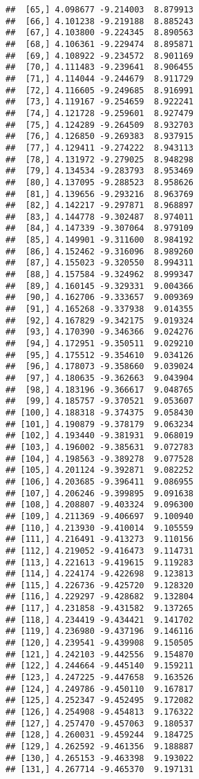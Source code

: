 \documentclass[]{book}
\theoremstyle{definition}
\theoremstyle{definition}
\theoremstyle{definition}
\theoremstyle{remark}
\begin{document}
\begin{verbatim}
##  [65,] 4.098677 -9.214003  8.879913
##  [66,] 4.101238 -9.219188  8.885243
##  [67,] 4.103800 -9.224345  8.890563
##  [68,] 4.106361 -9.229474  8.895871
##  [69,] 4.108922 -9.234572  8.901169
##  [70,] 4.111483 -9.239641  8.906455
##  [71,] 4.114044 -9.244679  8.911729
##  [72,] 4.116605 -9.249685  8.916991
##  [73,] 4.119167 -9.254659  8.922241
##  [74,] 4.121728 -9.259601  8.927479
##  [75,] 4.124289 -9.264509  8.932703
##  [76,] 4.126850 -9.269383  8.937915
##  [77,] 4.129411 -9.274222  8.943113
##  [78,] 4.131972 -9.279025  8.948298
##  [79,] 4.134534 -9.283793  8.953469
##  [80,] 4.137095 -9.288523  8.958626
##  [81,] 4.139656 -9.293216  8.963769
##  [82,] 4.142217 -9.297871  8.968897
##  [83,] 4.144778 -9.302487  8.974011
##  [84,] 4.147339 -9.307064  8.979109
##  [85,] 4.149901 -9.311600  8.984192
##  [86,] 4.152462 -9.316096  8.989260
##  [87,] 4.155023 -9.320550  8.994311
##  [88,] 4.157584 -9.324962  8.999347
##  [89,] 4.160145 -9.329331  9.004366
##  [90,] 4.162706 -9.333657  9.009369
##  [91,] 4.165268 -9.337938  9.014355
##  [92,] 4.167829 -9.342175  9.019324
##  [93,] 4.170390 -9.346366  9.024276
##  [94,] 4.172951 -9.350511  9.029210
##  [95,] 4.175512 -9.354610  9.034126
##  [96,] 4.178073 -9.358660  9.039024
##  [97,] 4.180635 -9.362663  9.043904
##  [98,] 4.183196 -9.366617  9.048765
##  [99,] 4.185757 -9.370521  9.053607
## [100,] 4.188318 -9.374375  9.058430
## [101,] 4.190879 -9.378179  9.063234
## [102,] 4.193440 -9.381931  9.068019
## [103,] 4.196002 -9.385631  9.072783
## [104,] 4.198563 -9.389278  9.077528
## [105,] 4.201124 -9.392871  9.082252
## [106,] 4.203685 -9.396411  9.086955
## [107,] 4.206246 -9.399895  9.091638
## [108,] 4.208807 -9.403324  9.096300
## [109,] 4.211369 -9.406697  9.100940
## [110,] 4.213930 -9.410014  9.105559
## [111,] 4.216491 -9.413273  9.110156
## [112,] 4.219052 -9.416473  9.114731
## [113,] 4.221613 -9.419615  9.119283
## [114,] 4.224174 -9.422698  9.123813
## [115,] 4.226736 -9.425720  9.128320
## [116,] 4.229297 -9.428682  9.132804
## [117,] 4.231858 -9.431582  9.137265
## [118,] 4.234419 -9.434421  9.141702
## [119,] 4.236980 -9.437196  9.146116
## [120,] 4.239541 -9.439908  9.150505
## [121,] 4.242103 -9.442556  9.154870
## [122,] 4.244664 -9.445140  9.159211
## [123,] 4.247225 -9.447658  9.163526
## [124,] 4.249786 -9.450110  9.167817
## [125,] 4.252347 -9.452495  9.172082
## [126,] 4.254908 -9.454813  9.176322
## [127,] 4.257470 -9.457063  9.180537
## [128,] 4.260031 -9.459244  9.184725
## [129,] 4.262592 -9.461356  9.188887
## [130,] 4.265153 -9.463398  9.193022
## [131,] 4.267714 -9.465370  9.197131

\end{verbatim}
\end{document}
